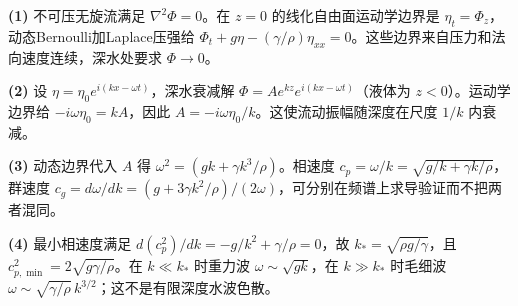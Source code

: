 \par\noindent\textbf{(1)} 不可压无旋流满足 \(\nabla^2\Phi=0\)。在 \(z=0\) 的线化自由面运动学边界是 \(\eta_t=\Phi_z\)，动态Bernoulli加Laplace压强给 \(\Phi_t+g\eta-(\gamma/\rho)\eta_{xx}=0\)。这些边界来自压力和法向速度连续，深水处要求 \(\Phi\to0\)。
\par\noindent\textbf{(2)} 设 \(\eta=\eta_0e^{i(kx-\omega t)}\)，深水衰减解 \(\Phi=Ae^{kz}e^{i(kx-\omega t)}\)（液体为 \(z<0\)）。运动学边界给 \(-i\omega\eta_0=kA\)，因此 \(A=-i\omega\eta_0/k\)。这使流动振幅随深度在尺度 \(1/k\) 内衰减。
\par\noindent\textbf{(3)} 动态边界代入 \(A\) 得 \(\omega^2=(gk+\gamma k^3/\rho)\)。相速度 \(c_p=\omega/k=\sqrt{g/k+\gamma k/\rho}\)，群速度 \(c_g=d\omega/dk=(g+3\gamma k^2/\rho)/(2\omega)\)，可分别在频谱上求导验证而不把两者混同。
\par\noindent\textbf{(4)} 最小相速度满足 \(d(c_p^2)/dk=-g/k^2+\gamma/\rho=0\)，故 \(k_*=\sqrt{\rho g/\gamma}\)，且 \(c_{p,\min}^2=2\sqrt{g\gamma/\rho}\)。在 \(k\ll k_*\) 时重力波 \(\omega\sim\sqrt{gk}\)，在 \(k\gg k_*\) 时毛细波 \(\omega\sim\sqrt{\gamma/\rho}\,k^{3/2}\)；这不是有限深度水波色散。
